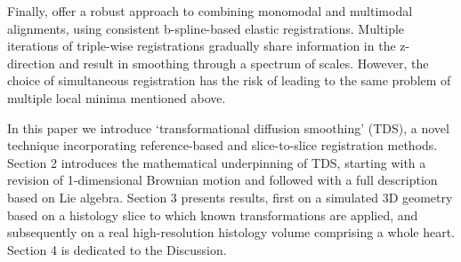   Finally, \cite{Arganda-Carreras2010} offer a robust approach to combining monomodal and multimodal alignments, using consistent b-spline-based elastic registrations. Multiple iterations of triple-wise registrations gradually share information in the z-direction and result in smoothing through a spectrum of scales. However, the choice of simultaneous registration has the risk of leading to the same problem of multiple local minima mentioned above.
  
  In this paper we introduce `transformational diffusion smoothing' (TDS), a novel technique incorporating reference-based and slice-to-slice registration methods. Section 2 introduces the mathematical underpinning of TDS, starting with a revision of 1-dimensional Brownian motion and followed with a full description based on Lie algebra. Section 3 presents results, first on a simulated 3D geometry based on a histology slice to which known transformations are applied, and subsequently on a real high-resolution histology volume comprising a whole heart. Section 4 is dedicated to the Discussion.
  
  


